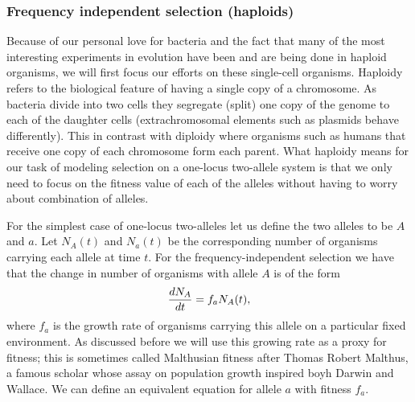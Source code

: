 \subsubsection{Frequency independent selection (haploids)}

Because of our personal love for bacteria and the fact that many of the most
interesting experiments in evolution have been and are being done in haploid
organisms, we will first focus our efforts on these single-cell organisms.
Haploidy refers to the biological feature of having a single copy of a
chromosome. As bacteria divide into two cells they segregate (split) one copy
of the genome to each of the daughter cells (extrachromosomal elements such as
plasmids behave differently). This in contrast with diploidy where organisms
such as humans that receive one copy of each chromosome form each parent. What
haploidy means for our task of modeling selection on a one-locus two-allele
system is that we only need to focus on the fitness value of each of the
alleles without having to worry about combination of alleles.

For the simplest case of one-locus two-alleles let us define the two alleles to
be $A$ and $a$. Let $N_A(t)$ and $N_a(t)$ be the corresponding number of
organisms carrying each allele at time $t$. For the frequency-independent 
selection we have that the change in number of organisms with allele $A$ is of
the form
\begin{equation}
  {d{N_A} \over dt} = f_a N_A(t),
\end{equation}
where $f_a$ is the growth rate of organisms carrying this allele on a
particular fixed environment. As discussed before we will use this growing rate
as a proxy for fitness; this is sometimes called Malthusian fitness after
Thomas Robert Malthus, a famous scholar whose assay on population growth
inspired boyh Darwin and Wallace. We can define an equivalent equation for
allele $a$ with fitness $f_a$.

